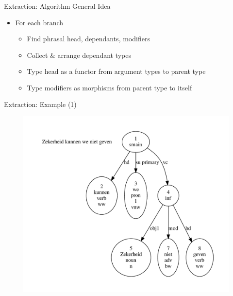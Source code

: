 \documentclass{beamer}
\begin{document}
\begin{frame}{Extraction: Algorithm}
\alert{General Idea}
\begin{itemize}
\item[] For each branch
	\begin{itemize}
		\item Find phrasal head, dependants, modifiers
		\item Collect \& arrange dependant types
		\item Type head as a functor from argument types to parent type
		\item Type modifiers as morphisms from parent type to itself
	\end{itemize}
\end{itemize}
\end{frame}

{
\begin{frame}{Extraction: Example (1)}
\begin{figure}
\includegraphics[scale=0.5]{zekerheid.pdf}
\end{figure}
\end{frame}
}
\end{document}
